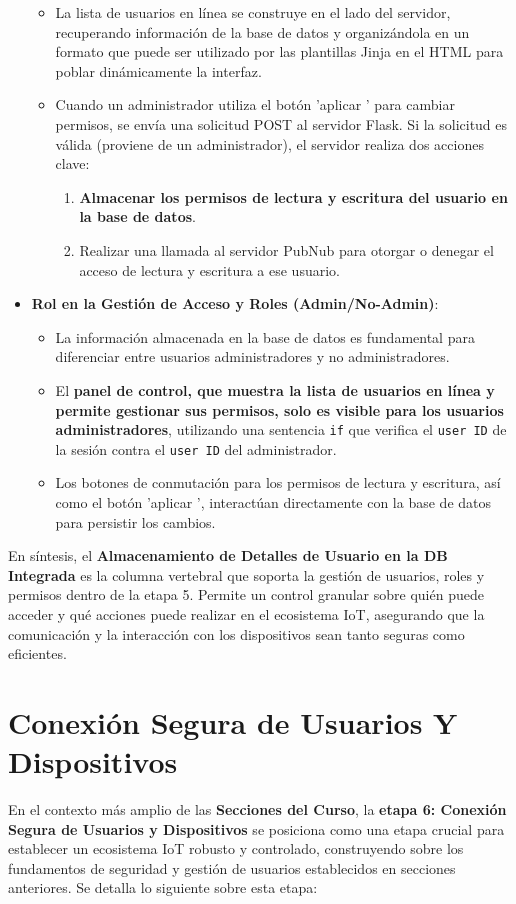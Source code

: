 \documentclass{report}
\begin{document}
\begin{itemize}
\begin{itemize}
        \item La lista de usuarios en línea se construye en el lado del servidor, recuperando información de la base de datos y organizándola en un 
        formato que puede ser utilizado por las plantillas Jinja en el HTML para poblar dinámicamente la interfaz.
        \item Cuando un administrador utiliza el botón  'aplicar ' para cambiar permisos, se envía una solicitud POST al servidor Flask. Si la solicitud 
        es válida (proviene de un administrador), el servidor realiza dos acciones clave:
        \begin{enumerate}
            \item \textbf{Almacenar los permisos de lectura y escritura del usuario en la base de datos}.
            \item Realizar una llamada al servidor PubNub para otorgar o denegar el acceso de lectura y escritura a ese usuario.
        \end{enumerate}
    \end{itemize}
    \item \textbf{Rol en la Gestión de Acceso y Roles (Admin/No-Admin)}:
    \begin{itemize}
        \item La información almacenada en la base de datos es fundamental para diferenciar entre usuarios administradores y no administradores.
        \item El \textbf{panel de control, que muestra la lista de usuarios en línea y permite gestionar sus permisos, solo es visible para los usuarios 
        administradores}, utilizando una sentencia \texttt{if} que verifica el \texttt{user ID} de la sesión contra el \texttt{user ID} del administrador.
        \item Los botones de conmutación para los permisos de lectura y escritura, así como el botón  'aplicar ', interactúan directamente con la base de 
        datos para persistir los cambios.
    \end{itemize}
\end{itemize}
En síntesis, el \textbf{Almacenamiento de Detalles de Usuario en la DB Integrada} es la columna vertebral que soporta la gestión de usuarios, roles y 
permisos dentro de la etapa 5. Permite un control granular sobre quién puede acceder y qué acciones puede realizar en el ecosistema IoT, asegurando 
que la comunicación y la interacción con los dispositivos sean tanto seguras como eficientes.

\section{Conexión Segura de Usuarios Y Dispositivos}
En el contexto más amplio de las \textbf{Secciones del Curso}, la \textbf{etapa 6: Conexión Segura de Usuarios y Dispositivos} se posiciona como una 
etapa crucial para establecer un ecosistema IoT robusto y controlado, construyendo sobre los fundamentos de seguridad y gestión de usuarios establecidos 
en secciones anteriores. Se detalla lo siguiente sobre esta etapa:
\end{document}
